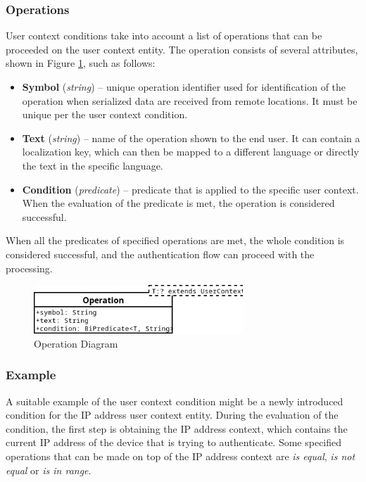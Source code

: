 \newpage

\subsubsection{Operations} \label{user-context-condition-operations}
User context conditions take into account a list of operations that can be proceeded on the user context entity.
The operation consists of several attributes, shown in Figure \ref{fig:operation-diagram}, such as follows:

\begin{itemize}
    \item \textbf{Symbol} (\textit{string}) -- unique operation identifier used for identification of the operation when serialized data are received from remote locations. It must be unique per the user context condition.
    \item \textbf{Text} (\textit{string}) -- name of the operation shown to the end user.
    It can contain a localization key, which can then be mapped to a different language or directly the text in the specific language. 
    \item \textbf{Condition} (\textit{predicate}) -- predicate that is applied to the specific user context. When the evaluation of the predicate is met, the operation is considered successful.
\end{itemize}

When all the predicates of specified operations are met, the whole condition is considered successful, and the authentication flow can proceed with the processing.

\begin{figure}[htbp]
  \centering
  \includegraphics[width=0.7\textwidth]{img/sections/5-design/operation-diagram.png}
  \caption{Operation Diagram}
  \label{fig:operation-diagram}
\end{figure}

\newpage

\subsubsection{Example}

A suitable example of the user context condition might be a newly introduced condition for the IP address user context entity.
During the evaluation of the condition, the first step is obtaining the IP address context, which contains the current IP address of the device that is trying to authenticate.
Some specified operations that can be made on top of the IP address context are \textit{is equal}, \textit{is not equal} or \textit{is in range}.

